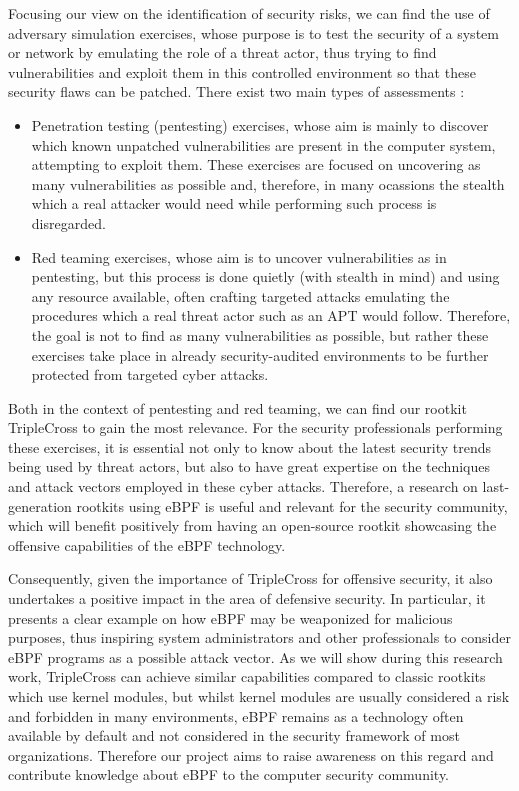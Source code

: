 Focusing our view on the identification of security risks, we can find the use of adversary simulation exercises, whose purpose is to test the security of a system or network by emulating the role of a threat actor, thus trying to find vulnerabilities and exploit them in this controlled environment so that these security flaws can be patched. There exist two main types of assessments \cite{pentest_redteam}:
\begin{itemize}
\item Penetration testing (pentesting) exercises, whose aim is mainly to discover which known unpatched vulnerabilities are present in the computer system, attempting to exploit them. These exercises are focused on uncovering as many vulnerabilities as possible and, therefore, in many ocassions the stealth which a real attacker would need while performing such process is disregarded.
\item Red teaming exercises, whose aim is to uncover vulnerabilities as in pentesting, but this process is done quietly (with stealth in mind) and using any resource available, often crafting targeted attacks emulating the procedures which a real threat actor such as an APT would follow. Therefore, the goal is not to find as many vulnerabilities as possible, but rather these exercises take place in already security-audited environments to be further protected from targeted cyber attacks.
\end{itemize}

Both in the context of pentesting and red teaming, we can find our rootkit TripleCross to gain the most relevance. For the security professionals performing these exercises, it is essential not only to know about the latest security trends being used by threat actors, but also to have great expertise on the techniques and attack vectors employed in these cyber attacks. Therefore, a research on last-generation rootkits using eBPF is useful and relevant for the security community, which will benefit positively from having an open-source rootkit showcasing the offensive capabilities of the eBPF technology.

Consequently, given the importance of TripleCross for offensive security, it also undertakes a positive impact in the area of defensive security. In particular, it presents a clear example on how eBPF may be weaponized for malicious purposes, thus inspiring system administrators and other professionals to consider eBPF programs as a possible attack vector. As we will show during this research work, TripleCross can achieve similar capabilities compared to classic rootkits which use kernel modules, but whilst kernel modules are usually considered a risk and forbidden in many environments, eBPF remains as a technology often available by default and not considered in the security framework of most organizations. Therefore our project aims to raise awareness on this regard and contribute knowledge about eBPF to the computer security community.


